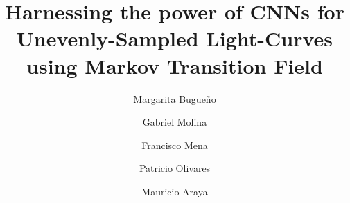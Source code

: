 \documentclass[review]{elsarticle}
\begin{document}
\begin{frontmatter}

\title{Harnessing the power of CNNs for Unevenly-Sampled Light-Curves using Markov Transition Field}


\author[UTFSM_SJ]{Margarita Bugue\~no}


\author[UTFSM_SJ]{Gabriel Molina}

\author[UTFSM_SJ]{Francisco Mena}

\author[UTFSM_CC]{Patricio Olivares}

\author[UTFSM_CC]{Mauricio Araya}


\address[UTFSM_SJ]{Depto. Inform\'atica, Universidad T\'ecnica Federico Santa Mar\'ia, Santiago, Chile}
\address[UTFSM_CC]{Depto. Electr\'onica, Universidad T\'ecnica Federico Santa Mar\'ia, Valpara\'iso, Chile}


\begin{abstract}


\end{abstract}
\end{frontmatter}
\end{document}
